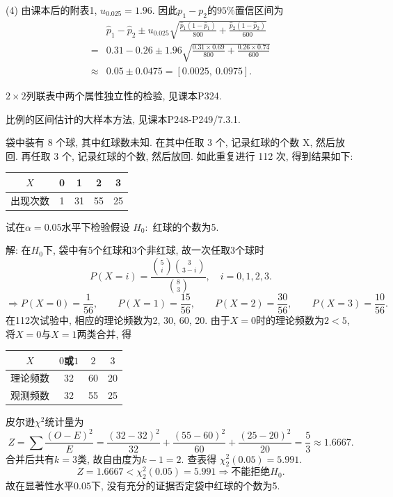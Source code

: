 \documentclass[standard]{ExBook}
\renewenvironment{shaded}{%
  \def\FrameCommand{\fboxsep=\FrameSep \colorbox{shadecolor}}%
  \MakeFramed{\advance\hsize-\width \FrameRestore}%
}{%
  \endMakeFramed
}
\begin{document}
\begin{qitems}
(4) 由课本后的附表1, $u_{0.025}=1.96$. 因此$p_1-p_2$的$95\%$置信区间为
$$
\begin{aligned}
&\hat{p}_1-\hat{p}_2
\pm u_{0.025}
\sqrt{
\frac{\hat{p}_1(1-\hat{p}_1)}{800}
+\frac{\hat{p}_2(1-\hat{p}_2)}{600}
}\\
={}&0.31-0.26
\pm1.96
\sqrt{
\frac{0.31\times0.69}{800}
+\frac{0.26\times0.74}{600}
}\\
\approx{}&0.05\pm0.0475
=[0.0025,\ 0.0975].
\end{aligned}
$$

\textcolor{themeColor}{\selectfont {} $2\times2$列联表中两个属性独立性的检验, 见课本P324.}

\textcolor{themeColor}{\selectfont {} 比例的区间估计的大样本方法, 见课本P248-P249/7.3.1.}

\vspace{2.5cm-5em}

    \begin{bbox}
    \begin{shaded}
        \qitem
袋中装有 8 个球, 其中红球数未知. 在其中任取 3 个, 记录红球的个数 X, 然后放回. 再任取 3 个, 记录红球的个数, 然后放回. 如此重复进行 112 次, 得到结果如下:
\begin{center}
\setlength{\tabcolsep}{38pt}
\begin{tabular}{c|cccc}
\hline
$X$ & 0 & 1 & 2 & 3 \\
\hline
出现次数 & 1 & 31 & 55 & 25 \\
\hline
\end{tabular}
\end{center}
试在$\alpha=0.05$水平下检验假设 $H_0 : $ 红球的个数为5.
    \end{shaded}
    \end{bbox}

\vspace{\dimexpr2.5cm-5em\relax}

解: 在$H_0$下, 袋中有5个红球和3个非红球, 故一次任取3个球时
$$
P(X=i)
=\frac{\binom{5}{i}\binom{3}{3-i}}{\binom{8}{3}},
\quad i=0,1,2,3.
$$
$$
\Longrightarrow
P(X=0)=\frac{1}{56},\qquad
P(X=1)=\frac{15}{56},\qquad
P(X=2)=\frac{30}{56},\qquad
P(X=3)=\frac{10}{56}.
$$
在112次试验中, 相应的理论频数为2, 30, 60, 20. 由于$X=0$时的理论频数为$2<5$, 将$X=0$与$X=1$两类合并, 得
\begin{center}
\setlength{\tabcolsep}{32pt}
\begin{tabular}{c|ccc}
\hline
$X$ & $0$或$1$ & $2$ & $3$\\
\hline
理论频数 & 32 & 60 & 20\\
观测频数 & 32 & 55 & 25\\
\hline
\end{tabular}
\end{center}
皮尔逊$\chi^2$统计量为
$$
Z
=\sum\frac{(O-E)^2}{E}
=\frac{(32-32)^2}{32}
+\frac{(55-60)^2}{60}
+\frac{(25-20)^2}{20}
=\frac{5}{3}
\approx1.6667.
$$
合并后共有$k=3$类, 故自由度为$k-1=2$. 查表得
$
\chi_2^2(0.05)=5.991
$.
$$
Z=1.6667<\chi_2^2(0.05)=5.991
\Longrightarrow
\text{不能拒绝}H_0.
$$
故在显著性水平$0.05$下, 没有充分的证据否定袋中红球的个数为5.


\end{qitems}
\end{document}
